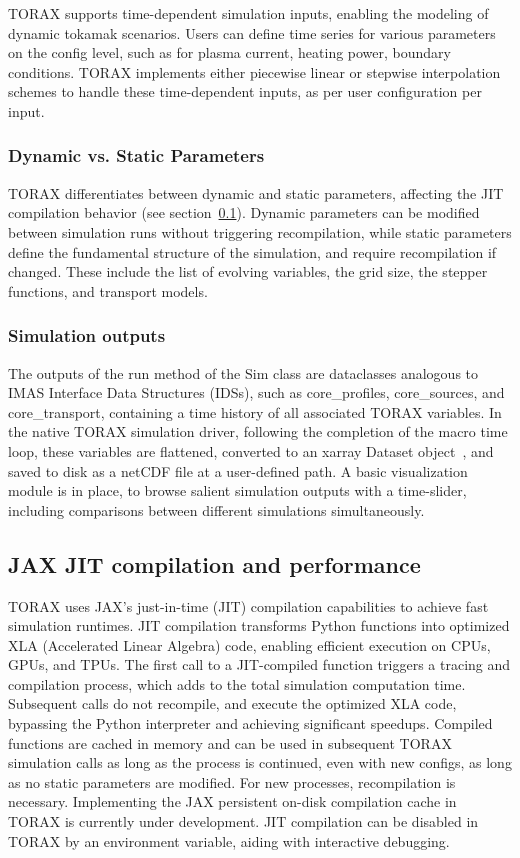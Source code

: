 \documentclass[aps, reprint, nofootinbib]{revtex4-2}
\begin{document}
TORAX supports time-dependent simulation inputs, enabling the modeling of dynamic tokamak scenarios.  Users can define time series for various parameters on the config level, such as for plasma current, heating power, boundary conditions. TORAX implements either piecewise linear or stepwise interpolation schemes to handle these time-dependent inputs, as per user configuration per input.

\subsubsection{Dynamic vs. Static Parameters}
TORAX differentiates between dynamic and static parameters, affecting the JIT compilation behavior (see section~\ref{sec:JIT}). Dynamic parameters can be modified between simulation runs without triggering recompilation, while static parameters define the fundamental structure of the simulation, and require recompilation if changed. These include the list of evolving variables, the grid size, the stepper functions, and transport models.

\subsubsection{Simulation outputs}
The outputs of the \textsf{run} method of the \textsf{Sim} class are dataclasses analogous to IMAS Interface Data Structures (IDSs), such as core\_profiles, core\_sources, and core\_transport, containing a time history of all associated TORAX variables. In the native TORAX simulation driver, following the completion of the macro time loop, these variables are flattened, converted to an xarray Dataset object~\cite{hoyer:xarray}, and saved to disk as a netCDF file at a user-defined path. A basic visualization module is in place, to browse salient simulation outputs with a time-slider, including comparisons between different simulations simultaneously.

\subsection{JAX JIT compilation and performance}
\label{sec:JIT}
TORAX uses JAX's just-in-time (JIT) compilation capabilities to achieve fast simulation runtimes. JIT compilation transforms Python functions into optimized XLA (Accelerated Linear Algebra) code, enabling efficient execution on CPUs, GPUs, and TPUs. The first call to a JIT-compiled function triggers a tracing and compilation process, which adds to the total simulation computation time. Subsequent calls do not recompile, and execute the optimized XLA code, bypassing the Python interpreter and achieving significant speedups. Compiled functions are cached in memory and can be used in subsequent TORAX simulation calls as long as the process is continued, even with new configs, as long as no static parameters are modified. For new processes, recompilation is necessary. Implementing the JAX persistent on-disk compilation cache in TORAX is currently under development. JIT compilation can be disabled in TORAX by an environment variable, aiding with interactive debugging.
\end{document}
